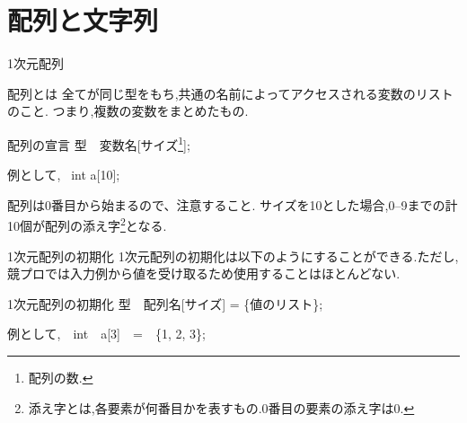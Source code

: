 \section{配列と文字列}
\begin{frame}{1次元配列}
    \begin{block}{配列とは}
        全てが同じ型をもち,共通の名前によってアクセスされる変数のリストのこと.
        つまり,複数の変数をまとめたもの.
    \end{block}
    \begin{block}{配列の宣言}
        型　変数名[サイズ\footnote{配列の数.}]; 
        
        例として,~ int a[10];
    \end{block}
    \begin{alertblock}{}
        配列は0番目から始まるので、注意すること.
        サイズを10とした場合,0--9までの計10個が配列の添え字\footnote{添え字とは,各要素が何番目かを表すもの.0番目の要素の添え字は0.}となる.
    \end{alertblock}
\end{frame}

\begin{frame}{1次元配列の初期化}
1次元配列の初期化は以下のようにすることができる.ただし,競プロでは入力例から値を受け取るため使用することはほとんどない.
\begin{block}{1次元配列の初期化}
    型　配列名[サイズ] = \{値のリスト\};
    
    例として,　int　a[3]　=　\{1, 2, 3\};
    
\end{block}
\end{frame}

